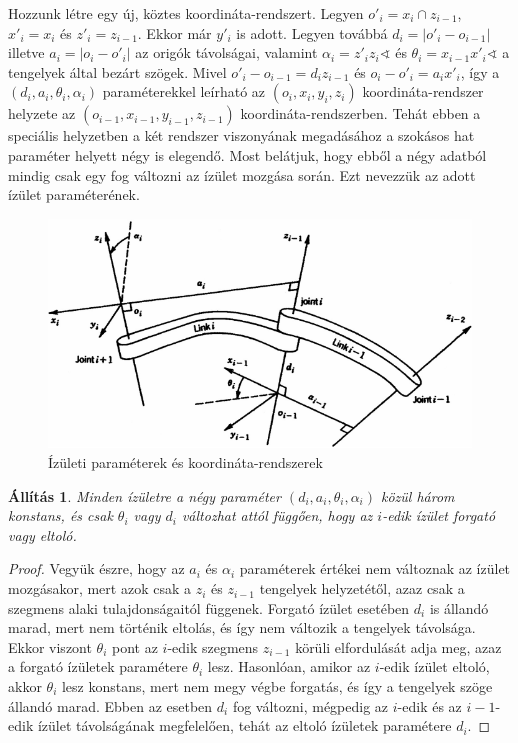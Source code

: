 \documentclass[12pt,a4paper]{report}
\newtheorem{áll}[tét]{Állítás}
\theoremstyle{remark}
\theoremstyle{definition}
\begin{document}
Hozzunk létre egy új, köztes koordináta-rendszert. Legyen $o'_i = x_i \cap z_{i-1}$, $x'_i = x_i$ és 
$z'_i = z_{i-1}$. Ekkor már $y'_i$ is adott. Legyen továbbá $d_i = |o'_i - o_{i-1}|$ illetve $a_i = |o_i - o'_i|$ az 
origók távolságai, valamint $\alpha_i = z'_i z_i \sphericalangle$ és $\theta_i = x_{i-1} x'_i \sphericalangle$ a 
tengelyek által bezárt szögek. Mivel $o'_i - o_{i-1} = d_i z_{i-1}$ és $o_i - o'_i = a_i x'_i$, így a 
$(d_i, a_i, \theta_i, \alpha_i)$ paraméterekkel leírható az $(o_i, x_i, y_i, z_i)$ koordináta-rendszer helyzete az 
$(o_{i-1}, x_{i-1}, y_{i-1}, z_{i-1})$ koordináta-rendszerben. Tehát ebben a speciális helyzetben a két rendszer 
viszonyának megadásához a szokásos hat paraméter helyett négy is elegendő. Most belátjuk, hogy ebből a négy adatból 
mindig csak egy fog változni az ízület mozgása során. Ezt nevezzük az adott ízület paraméterének.

\begin{figure}[ht]
\centering
\includegraphics[width=0.9\linewidth]{./images/Link_frames}
\caption{Ízületi paraméterek és koordináta-rendszerek}
\end{figure}

\begin{áll}
Minden ízületre a négy paraméter $(d_i, a_i, \theta_i, \alpha_i)$ közül három konstans, és csak $\theta_i$ vagy 
$d_i$ változhat attól függően, hogy az $i$-edik ízület forgató vagy eltoló.
\end{áll}

\begin{proof}
Vegyük észre, hogy az $a_i$ és $\alpha_i$ paraméterek értékei nem változnak az ízület mozgásakor, mert azok csak a
$z_i$ és $z_{i-1}$ tengelyek helyzetétől, azaz csak a szegmens alaki tulajdonságaitól függenek. Forgató ízület 
esetében $d_i$ is állandó marad, mert nem történik eltolás, és így nem változik a tengelyek távolsága. Ekkor viszont 
$\theta_i$ pont az $i$-edik szegmens $z_{i-1}$ körüli elfordulását adja meg, azaz a forgató ízületek paramétere 
$\theta_i$ lesz. Hasonlóan, amikor az $i$-edik ízület eltoló, akkor $\theta_i$ lesz konstans, mert nem megy végbe 
forgatás, és így a tengelyek szöge állandó marad. Ebben az esetben $d_i$ fog változni, mégpedig az $i$-edik és az 
${i-1}$-edik ízület távolságának megfelelően, tehát az eltoló ízületek paramétere $d_i$.
\end{proof}
\end{document}
